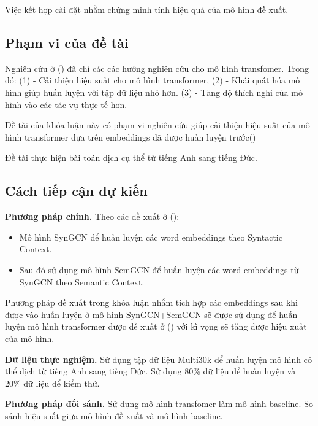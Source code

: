 \documentclass{article}[14pt]
\begin{document}
{    Việc kết hợp cài đặt nhằm chứng minh tính hiệu quả của mô hình đề xuất.
    
    \subsection{Phạm vi của đề tài}
    
    Nghiên cứu ở (\cite{transfomer-survey}) đã chỉ các các hướng nghiên cứu cho mô hình transfomer. Trong đó: (1) - Cải thiện hiệu suất cho mô hình transformer, (2) - Khái quát hóa mô hình giúp huấn luyện với tập dữ liệu nhỏ hơn. (3) - Tăng độ thích nghi của mô hình vào các tác vụ thực tế hơn.

    Đề tài của khóa luận này  có phạm vi nghiên cứu giúp cải thiện hiệu suất của mô hình transformer dựa trên embeddings đã được huấn luyện trước(\cite{wordgcn2019})
    
    Đề tài thực hiện bài toán dịch cụ thể từ tiếng Anh sang tiếng Đức.
    
    \subsection{Cách tiếp cận dự kiến}
    
    
    \Large{\textbf{Phương pháp chính.}} Theo các đề xuất ở (\cite{wordgcn2019}):
    \begin{itemize}
        \item Mô hình SynGCN để huấn luyện các word embeddings theo Syntactic Context.
        \item Sau đó sử dụng mô hình SemGCN để huấn luyện các word embeddings từ SynGCN theo Semantic Context.
    \end{itemize}  
    Phương pháp đề xuất trong khóa luận nhắm tích hợp các embeddings sau khi được vào huấn luyện ở mô hình SynGCN+SemGCN sẽ được sử dụng để huấn luyện mô hình transformer được đề xuất ở (\cite{transformer}) với kì vọng sẽ tăng được hiệu xuất của mô hình.

    \Large{\textbf{Dữ liệu thực nghiệm.}} Sử dụng tập dữ liệu Multi30k để huấn luyện mô hình có thể dịch từ tiếng Anh sang tiếng Đức. Sử dụng 80\% dữ liệu để huấn luyện và 20\% dữ liệu để kiểm thử.

    \Large{\textbf{Phương pháp đối sánh.}} Sử dụng mô hình transfomer làm mô hình baseline. So sánh hiệu suất giữa mô hình đề xuất và mô hình baseline.

}
\end{document}
